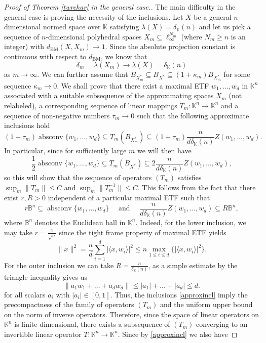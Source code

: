 \documentclass[12pt, reqno]{amsart}
\theoremstyle{definition}
\theoremstyle{remark}
\numberwithin{equation}{section}
\DeclareMathOperator{\absconv}{absconv}
\newcommand\dbm{d_{\mathrm{BM}}}
\begin{document}
\begin{proof}[Proof of Theorem \ref{twrchar} in the general case.]
The main difficulty in the general case is proving the necessity of the inclusions. Let $X$ be a general $n$-dimensional normed space over $\mathbb{K}$ satisfying $\lambda(X) = \delta_{\mathbb{K}}(n)$ and let us pick a sequence of $n$-dimensional polyhedral spaces $X_m \subseteq \ell_{\infty}^{N_m}$ (where $N_m \geq n$ is an integer) with $\dbm(X, X_m) \to 1$. Since the absolute projection constant is continuous with respect to $\dbm$, we know that 
$$\delta_m = \lambda(X_m) \to \lambda(X) = \delta_{\mathbb{K}}(n)$$
as $m \to \infty$. We can further assume that $B_{X^*_m} \subseteq B_{X^*} \subseteq (1+\kappa_m)B_{X^*_m}$ for some sequence $\kappa_m \to 0$. We shall prove that there exist a maximal ETF $w_1, \ldots, w_d$ in $\mathbb{K}^n$ associated with a suitable subsequence of the approximating spaces $X_m$ (not relabeled), a corresponding sequence of linear mappings $T_m:\mathbb{K}^n \to \mathbb{K}^n$ and a sequence of non-negative numbers $\tau_m \to 0$ such that the following approximate inclusions hold
\begin{equation}
\label{approxincl}
(1-\tau_m)\absconv \{w_1, \ldots, w_d\} \subseteq T_m(B_{X_m^*}) \subseteq (1+\tau_m) \frac{n}{d\delta_{\mathbb{K}}(n)} Z(w_1, \ldots, w_d).
\end{equation}
In particular, since for sufficiently large $m$ we will then have
$$\frac{1}{2}\absconv \{w_1, \ldots, w_d\} \subseteq T_m(B_{X^*}) \subseteq 2\frac{n}{d\delta_{\mathbb{K}}(n)} Z(w_1, \ldots, w_d),$$
so this will show that the sequence of operators $(T_m)$ satisfies $\sup_{m} \|T_m\| \leq C$ and $\sup_{m} \|T^{-1}_m\| \leq C$. This follows from the fact that there exist $r, R>0$ independent of a particular maximal ETF such that
$$r\mathbb{B}^n \subseteq \absconv \{w_1, \ldots, w_d\} \quad \text{ and } \quad \frac{n}{d\delta_{\mathbb{K}}(n)} Z(w_1, \ldots, w_d) \subseteq R\mathbb{B}^n,$$
where $\mathbb{B}^n$ denotes the Euclidean ball in $\mathbb{K}^n$. Indeed, for the lower inclusion, we may take $r=\frac{1}{\sqrt{n}}$ since the tight frame property of maximal ETF yields
$$\|x\|^2 = \frac{n}{d} \sum_{i=1}^{d} |\langle x, w_i \rangle |^2  \leq n \max_{1 \leq i \leq d}\{ |\langle x, w_i \rangle|^2\}.$$
For the outer inclusion we can take $R=\frac{n}{\delta_{\mathbb{K}}(n)}$, as a simple estimate by the triangle inequality gives us
$$\|a_1w_1 + \ldots + a_dw_d\| \leq |a_1| + \ldots + |a_d| \leq d.$$
for all scalars $a_i$ with $|a_i| \in [0, 1]$. 
Thus, the inclusions \eqref{approxincl} imply the precompactness of the family of operators $(T_m)$ and the uniform upper bound on the norm of inverse operators. Therefore, since the space of linear operators on $\mathbb{K}^{n}$ is finite-dimensional, there exists a subsequence of $(T_m)$ converging to an invertible linear operator $T: \mathbb{K}^n \to \mathbb{K}^n$. Since by \eqref{approxincl} we also have

\end{proof}
\end{document}
